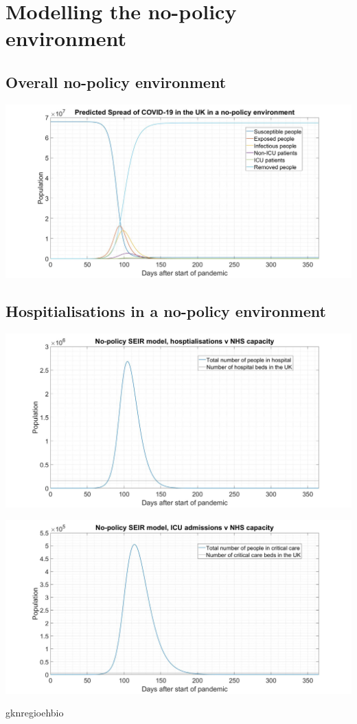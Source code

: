\documentclass[11pt]{article}
\begin{document}
\section{Modelling the no-policy environment}
\subsection{Overall no-policy environment}
\begin{center}
\includegraphics[width=1\textwidth]{No-policySEIHR.jpg} 
\end{center}
\subsection{Hospitialisations in a no-policy environment}
\begin{center}
\includegraphics[width=1\textwidth]{No-policyH.jpg} 
\end{center}
\begin{center}
\includegraphics[width=1\textwidth]{No-policyHICU.jpg} 
\end{center}
gknregioehbio
\end{document}
